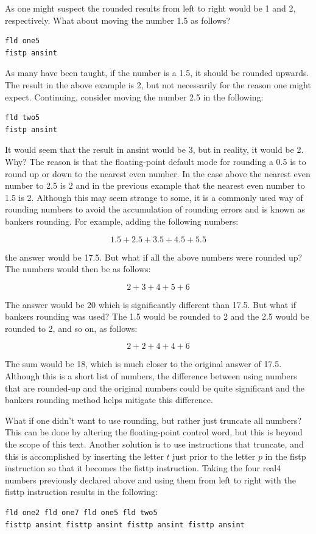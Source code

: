 \documentclass[10pt]{book}
\begin{document}
As one might suspect the rounded results from left to right would be 1 and 2, respectively. What about moving the number 1.5 as follows?

\begin{verbatim}
fld one5
fistp ansint
\end{verbatim}

As many have been taught, if the number is a 1.5, it should be rounded upwards. The result in the above example is 2, but not necessarily for the reason one might expect. Continuing, consider moving the number 2.5 in the following:

\begin{verbatim}
fld two5
fistp ansint
\end{verbatim}

It would seem that the result in ansint would be 3, but in reality, it would be 2. Why? The reason is that the floating-point default mode for rounding a 0.5 is to round up or down to the nearest even number. In the case above the nearest even number to 2.5 is 2 and in the previous example that the nearest even number to 1.5 is 2. Although this may seem strange to some, it is a commonly used way of rounding numbers to avoid the accumulation of rounding errors and is known as bankers rounding. For example, adding the following numbers:

$$
1.5+2.5+3.5+4.5+5.5
$$

the answer would be 17.5. But what if all the above numbers were rounded up? The numbers would then be as follows:

$$
2+3+4+5+6
$$

The answer would be 20 which is significantly different than 17.5. But what if bankers rounding was used? The 1.5 would be rounded to 2 and the 2.5 would be rounded to 2, and so on, as follows:

$$
2+2+4+4+6
$$

The sum would be 18, which is much closer to the original answer of 17.5. Although this is a short list of numbers, the difference between using numbers that are rounded-up and the original numbers could be quite significant and the bankers rounding method helps mitigate this difference.

What if one didn't want to use rounding, but rather just truncate all numbers? This can be done by altering the floating-point control word, but this is beyond the scope of this text. Another solution is to use instructions that truncate, and this is accomplished by inserting the letter $t$ just prior to the letter $p$ in the fistp instruction so that it becomes the fisttp instruction. Taking the four real4 numbers previously declared above and using them from left to right with the fisttp instruction results in the following:
\begin{verbatim}
fld one2 fld one7 fld one5 fld two5
fisttp ansint fisttp ansint fisttp ansint fisttp ansint
\end{verbatim}
\end{document}
